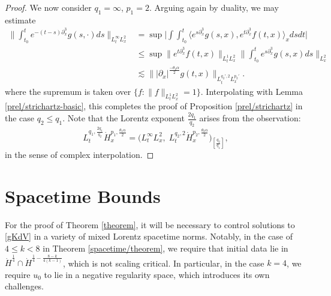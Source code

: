 \documentclass[10pt, reqno]{amsart}
\numberwithin{equation}{section}
\theoremstyle{definition}
\theoremstyle{remark}
\begin{document}
\begin{proof}
    We now consider $q_1 = \infty$, $p_1 = 2$. Arguing again by duality, we may estimate
    \begin{align*}
        \bigg\|\int_{t_0}^t e^{-(t-s)\partial_x^3} g(s,\cdot) ds\bigg\|_{L_t^\infty L_x^2}
        & = \sup\bigg|\int \int_{t_0}^t\Big\langle  e^{s\partial_x^3} g(s,x),e^{t\partial_x^3}f(t,x)\Big\rangle_{x}dsdt\bigg| \\
        & \leq \sup\big\|e^{t\partial_x^3} f(t,x)\big\|_{L_t^1L_x^2}\bigg\|\int_{t_0}^t e^{s\partial_x^3}g(s,x)ds\bigg\|_{L_x^2} \\
        & \lesssim \Big\||\partial_x|^\frac{-\theta_2\alpha}{2} g(t,x) \Big\|_{L_t^{q_2',2}L_x^{p_2'}}.
    \end{align*}
    where the supremum is taken over $\{f : \|f\|_{L_t^1 L_x^2} = 1\}$. Interpolating with Lemma \ref{prel/strichartz-basic}, this completes the proof of Proposition \ref{prel/strichartz} in the case $q_2 \leq q_1$. Note that the Lorentz exponent $\frac{2q_1}{q_2}$ arises from the observation:
    \begin{equation*}
        L_t^{q_1,\frac{2q_1}{q_2}}\dot{H}_x^{p_1,\frac{\theta_1\alpha}{2}} = \Big( L_t^\infty L_x^2,\;L_t^{q_2,2}\dot{H}_x^{p_2,\frac{\theta_2\alpha}{2}}\Big)_{\left[\frac{q_2}{q_1}\right]},
    \end{equation*}
    in the sense of complex interpolation.
\end{proof}



\section{Spacetime Bounds}
    For the proof of Theorem \ref{theorem}, it will be necessary to control solutions to \eqref{gKdV} in a variety of mixed Lorentz spacetime norms.
    Notably, in the case of $4 \leq k < 8$ in Theorem \ref{spacetime/theorem}, we require that initial data lie in $\dot{H}^\frac{1}{4} \cap \dot{H}^{\frac{1}{4} - \frac{8-k}{4(k-1)}}$, which is not scaling critical. In particular, in the case $k = 4$, we require $u_0$ to lie in a negative regularity space, which introduces its own challenges.
\end{document}
